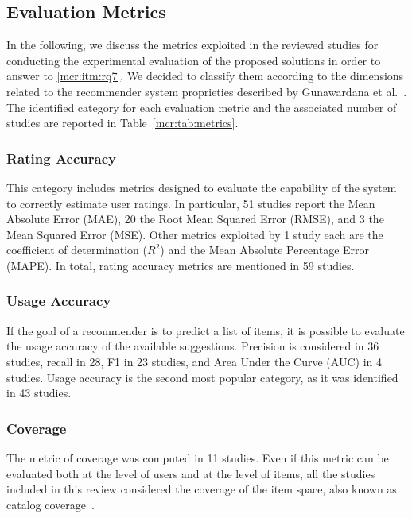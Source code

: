 \subsection{Evaluation Metrics}
\label{mcr:sec:metrics}

In the following, we discuss the metrics exploited in the reviewed studies for conducting the experimental evaluation of the proposed solutions in order to answer to \ref{mcr:itm:rq7}. We decided to classify them according to the dimensions related to the recommender system proprieties described by Gunawardana et al.~\cite{Gunawardana2015}. The identified category for each evaluation metric and the associated number of studies are reported in Table~\ref{mcr:tab:metrics}.

\subsubsection{Rating Accuracy}

This category includes metrics designed to evaluate the capability of the system to correctly estimate user ratings. In particular, 51 studies report the Mean Absolute Error (MAE), 20 the Root Mean Squared Error (RMSE), and 3 the Mean Squared Error (MSE). Other metrics exploited by 1 study each are the coefficient of determination ($R^2$) and the Mean Absolute Percentage Error (MAPE). In total, rating accuracy metrics are mentioned in 59 studies.

\subsubsection{Usage Accuracy}

If the goal of a recommender is to predict a list of items, it is possible to evaluate the usage accuracy of the available suggestions. Precision is considered in 36 studies, recall in 28, F1 in 23 studies, and Area Under the Curve (AUC) in 4 studies. Usage accuracy is the second most popular category, as it was identified in 43 studies.

\subsubsection{Coverage}

The metric of coverage was computed in 11 studies. Even if this metric can be evaluated both at the level of users and at the level of items, all the studies included in this review considered the coverage of the item space, also known as catalog coverage~\cite{Herlocker2004}.

